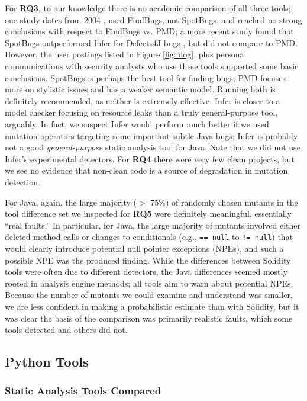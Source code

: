 For {\bf RQ3}, to our knowledge there is no academic comparison of all three tools; one study dates from 2004 \cite{CompareJavaTools}, used FindBugs, not SpotBugs, and reached no strong conclusions with respect to FindBugs vs. PMD; a more recent study found that SpotBugs outperformed Infer for Defects4J \cite{just2014defects4j} bugs \cite{AllBugs}, but did not compare to PMD.  However, the user postings listed in Figure \ref{fig:blog}, plus personal communications with security analysts who use these tools \cite{personalJava} supported some basic conclusions.  SpotBugs is perhaps the best tool for finding bugs; PMD focuses more on stylistic issues and has a weaker semantic model.  Running both is definitely recommended, as neither is extremely effective.  Infer is closer to a model checker focusing on resource leaks than a truly general-purpose tool, arguably.  In fact, we suspect Infer would perform much better if we used mutation operators targeting some important subtle Java bugs; Infer is probably not a good \emph{general-purpose} static analysis tool for Java.  Note that we did not use Infer's experimental detectors.
For {\bf RQ4} there were very few clean projects, but we see no evidence that non-clean code is a source of degradation in mutation detection.

For Java, again, the large majority ($>$ 75\%) of randomly chosen mutants in the tool difference set we inspected for {\bf RQ5} were definitely meaningful, essentially ``real faults.''  In particular, for Java, the large majority of mutants involved either deleted method calls or changes to conditionals (e.g., {\tt == null} to {\tt != null}) that would clearly introduce potential null pointer exceptions (NPEs), and such a possible NPE was the produced finding.  While the differences between Solidity tools were often due to different detectors, the Java differences seemed mostly rooted in analysis engine methods; all tools aim to warn about potential NPEs.  Because the number of mutants we could examine and understand was smaller, we are less confident in making a probabilistic estimate than with Solidity, but it was clear the basis of the comparison was primarily realistic faults, which some tools detected and others did not.

\subsection{Python Tools}

\subsubsection{Static Analysis Tools Compared}

